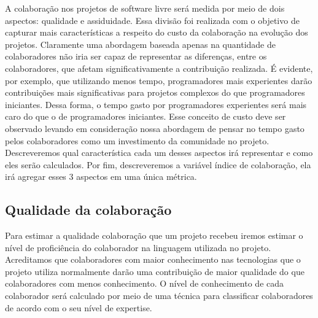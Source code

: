 A colaboração nos projetos de software livre será medida por meio de dois aspectos:  qualidade e assiduidade. Essa divisão foi realizada com o objetivo de capturar mais características a respeito do custo da colaboração na evolução dos projetos. Claramente uma abordagem baseada apenas na quantidade de colaboradores não iria ser capaz de representar as diferenças, entre os colaboradores, que afetam significativamente a contribuição realizada. É evidente, por exemplo, que utilizando menos tempo, programadores mais experientes darão contribuições mais significativas para projetos complexos do que programadores iniciantes. Dessa forma, o tempo gasto por programadores experientes será mais caro do que o de programadores iniciantes. Esse conceito de custo deve ser observado levando em consideração nossa abordagem de pensar no tempo gasto pelos colaboradores como um investimento da comunidade no projeto.  Descreveremos qual  característica cada um desses aspectos irá representar e como eles serão calculados. Por fim, descreveremos a variável índice de colaboração, ela irá agregar esses 3 aspectos em uma única métrica.

\subsection{Qualidade da colaboração}
\label{cap_modelo_colaboracao_concreto}

Para estimar a qualidade  colaboração que um projeto recebeu iremos estimar o  nível de proficiência do colaborador na linguagem utilizada no projeto. Acreditamos que colaboradores com maior conhecimento nas tecnologias que o projeto utiliza normalmente darão uma contribuição de maior qualidade do que colaboradores com menos conhecimento. O nível de conhecimento de cada colaborador será calculado por meio de uma técnica para classificar colaboradores de acordo com o seu nível de expertise. 

